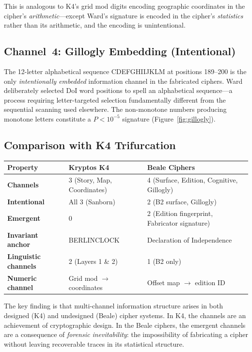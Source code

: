 \documentclass[11pt,a4paper]{article}
\begin{document}
This is analogous to K4's grid mod digits encoding geographic coordinates
in the cipher's \emph{arithmetic}---except Ward's signature is encoded
in the cipher's \emph{statistics} rather than its arithmetic, and the
encoding is unintentional.

\subsection{Channel~4: Gillogly Embedding (Intentional)}

The 12-letter alphabetical sequence CDEFGHIIJKLM at positions 189--200
is the only \emph{intentionally embedded} information channel in the
fabricated ciphers. Ward deliberately selected DoI word positions to
spell an alphabetical sequence---a process requiring letter-targeted
selection fundamentally different from the sequential scanning used
elsewhere. The non-monotone numbers producing monotone letters constitute
a $P < 10^{-5}$ signature (Figure~\ref{fig:gillogly}).

\subsection{Comparison with K4 Trifurcation}

\begin{center}
\begin{tabular}{@{}p{2.5cm}p{5cm}p{5cm}@{}}
\toprule
\textbf{Property} & \textbf{Kryptos K4} & \textbf{Beale Ciphers} \\
\midrule
\textbf{Channels} & 3 (Story, Map, Coordinates) & 4 (Surface, Edition, Cognitive, Gillogly) \\
\textbf{Intentional} & All 3 (Sanborn) & 2 (B2 surface, Gillogly) \\
\textbf{Emergent} & 0 & 2 (Edition fingerprint, Fabricator signature) \\
\textbf{Invariant anchor} & BERLINCLOCK & Declaration of Independence \\
\textbf{Linguistic channels} & 2 (Layers 1 \& 2) & 1 (B2 only) \\
\textbf{Numeric channel} & Grid mod $\to$ coordinates & Offset map $\to$ edition ID \\
\bottomrule
\end{tabular}
\end{center}

The key finding is that multi-channel information structure arises in
both designed (K4) and undesigned (Beale) cipher systems. In K4, the
channels are an achievement of cryptographic design. In the Beale ciphers,
the emergent channels are a consequence of \emph{forensic inevitability}:
the impossibility of fabricating a cipher without leaving recoverable
traces in its statistical structure.
\end{document}
